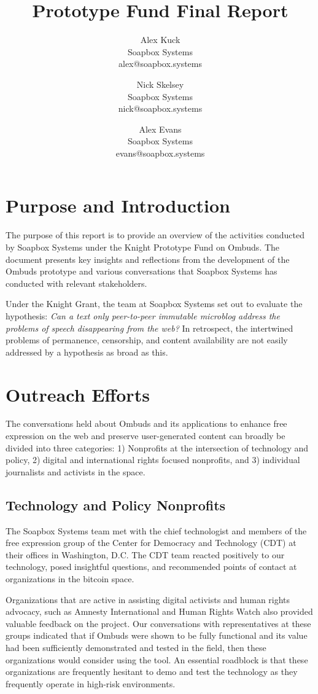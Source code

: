\documentclass[a4paper]{article}
\title{Prototype Fund Final Report}
\author{
{\rm Alex Kuck}\\
Soapbox Systems\\
alex@soapbox.systems
\and
{\rm Nick Skelsey}\\
Soapbox Systems\\
nick@soapbox.systems
\and
{\rm Alex Evans}\\
Soapbox Systems\\
evans@soapbox.systems
}
\begin{document}
\maketitle

\section{Purpose and Introduction} 

The purpose of this report is to provide an overview of the activities conducted by Soapbox Systems under the Knight Prototype Fund on Ombuds. The document presents key insights and reflections from the development of the Ombuds prototype and various conversations that Soapbox Systems has conducted with relevant stakeholders.\par
Under the Knight Grant, the team at Soapbox Systems set out to evaluate the hypothesis: \textit{Can a text only peer-to-peer immutable microblog address the problems of speech disappearing from the web?} In retrospect, the intertwined problems of permanence, censorship, and content availability are not easily addressed by a hypothesis as broad as this.

\section{Outreach Efforts}
The conversations held about Ombuds and its applications to enhance free expression on the web and preserve user-generated content can broadly be divided into three categories: 1) Nonprofits at the intersection of technology and policy, 2) digital and international rights focused nonprofits, and 3) individual journalists and activists in the space.\par

\subsection{Technology and Policy Nonprofits}
The Soapbox Systems team met with the chief technologist and members of the free expression group of the Center for Democracy and Technology (CDT) at their offices in Washington, D.C. The CDT team reacted positively to our technology, posed insightful questions, and recommended points of contact at organizations in the bitcoin space.\par

Organizations that are active in assisting digital activists and human rights advocacy, such as Amnesty International and Human Rights Watch also provided valuable feedback on the project. Our conversations with representatives at these groups indicated that if Ombuds were shown to be fully functional and its value had been sufficiently demonstrated and tested in the field, then these organizations would consider using the tool. An essential roadblock is that these organizations are frequently hesitant to demo and test the technology as they frequently operate in high-risk environments.\par
\end{document}
